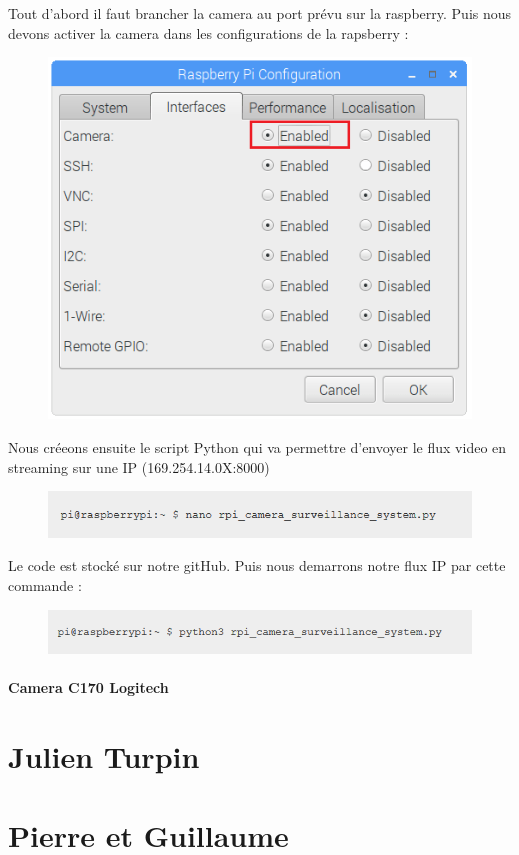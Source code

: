 \documentclass[a4paper,11pt]{report}
\begin{document}
			Tout d'abord il faut brancher la camera au port prévu sur la raspberry. \newline
			Puis nous devons activer la camera dans les configurations de la rapsberry :
			\begin{figure}[!h]
				\begin{center}
					\includegraphics[scale=0.7]{Illustrations/11.png}
				\end{center}
			\end{figure}
		  \newline Nous créeons ensuite le script Python qui va permettre d'envoyer le flux video en streaming sur une IP (169.254.14.0X:8000)
			\begin{figure}[!h]
				\begin{center}
					\includegraphics[scale=0.7]{Illustrations/12.png}
				\end{center}
			\end{figure}
			\newline Le code est stocké sur notre gitHub.\newpage
			Puis nous demarrons notre flux IP par cette commande :
			\begin{figure}[!h]
				\begin{center}
					\includegraphics[scale=0.7]{Illustrations/13.png}
				\end{center}
			\end{figure}
			
			\subsubsection{Camera C170 Logitech}
			
\chapter{Julien Turpin}

\chapter{Pierre et Guillaume}
\end{document}
